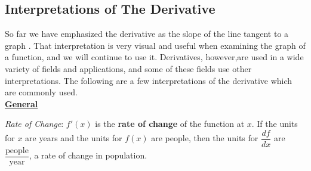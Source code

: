 \begin{figure}[H]
\begin{minipage}{0.235\textwidth}
\begin{center}
\begin{tikzpicture}[scale =0.8]
\end{tikzpicture}
\end{center}
\end{minipage}
\begin{minipage}{0.235\textwidth}

\begin{center}

\end{center}
\end{minipage}

\caption{} 
\label{fig:dervBeh}

\end{figure}

\newpage
\subsection*{Interpretations of The Derivative }
\vspace{-0.25cm}
So far we have emphasized the derivative as the slope of the line tangent to a graph . That interpretation is very visual and useful when examining the graph of a function, and we will continue to use it. Derivatives, however,are used in a wide variety of fields and applications, and some of these fields use other interpretations. The
following are a few interpretations of the derivative which are commonly used.\\

\noindent\textbf{\underline{General}}
\begin{justify}
\emph{Rate of Change}: $f'(x)$ is the \textbf{rate of change} of the function at $x$. If the units for $x$ are years and the units for $f(x)$ are people, then the units for $\dfrac{df}{dx}$ are $\dfrac{\text{people}}{\text{year}}$, a rate of change in population.\\
\end{justify}

